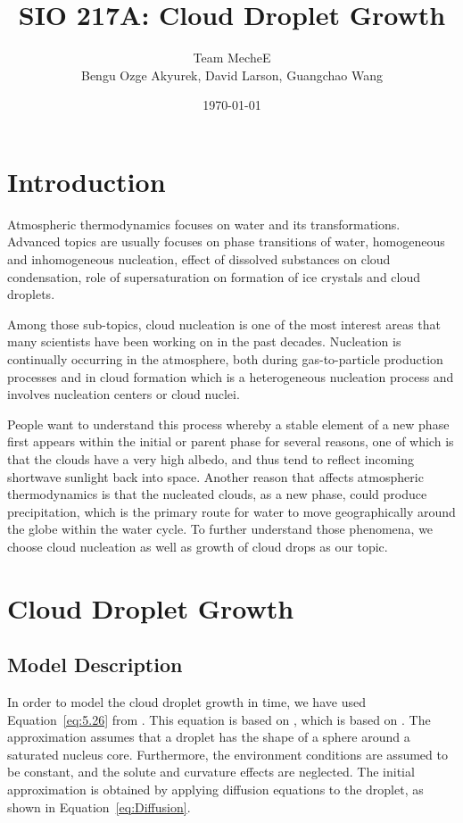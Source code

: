 \documentclass[]{article}
\title{SIO 217A: Cloud Droplet Growth}
\author{Team MecheE \\ Bengu Ozge Akyurek, David Larson, Guangchao Wang}
\date{\today}
\begin{document}
\maketitle


\section{Introduction}
Atmospheric thermodynamics focuses on water and its transformations. Advanced
topics are usually focuses on phase transitions of water, homogeneous and
inhomogeneous nucleation, effect of dissolved substances on cloud condensation,
role of supersaturation on formation of ice crystals and cloud droplets.

Among those sub-topics, cloud nucleation is one of the most interest areas that
many scientists have been working on in the past decades. Nucleation is
continually occurring in the atmosphere, both during gas-to-particle production
processes and in cloud formation which is a heterogeneous nucleation process
and involves nucleation centers or cloud nuclei.

People want to understand this process whereby a stable element of a new phase
first appears within the initial or parent phase for several reasons, one of
which is that the clouds have a very high albedo, and thus tend to reflect
incoming shortwave sunlight back into space. Another reason that affects
atmospheric thermodynamics is that the nucleated clouds, as a new phase, could
produce precipitation, which is the primary route for water to move
geographically around the globe within the water cycle. To further understand
those phenomena, we choose cloud nucleation as well as growth of cloud drops as
our topic.



\section{Cloud Droplet Growth}

\subsection{Model Description}
In order to model the cloud droplet growth in time, we have used
Equation~\eqref{eq:5.26} from \cite{Curry}. This equation is based on
\cite{Mason}, which is based on \cite{Best}. The approximation assumes that a
droplet has the shape of a sphere around a saturated nucleus core. Furthermore,
the environment conditions are assumed to be constant, and the solute and
curvature effects are neglected. The initial approximation is obtained by
applying diffusion equations to the droplet, as shown in
Equation~\eqref{eq:Diffusion}.
\end{document}
